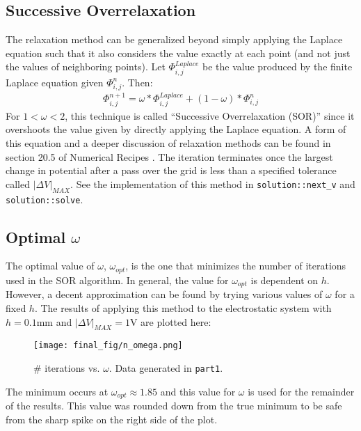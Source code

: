 \documentclass[12pt]{article}
\begin{document}
\subsection{Successive Overrelaxation}
The relaxation method can be generalized beyond simply applying the Laplace equation such that it also considers the value exactly at each point (and not just the values of neighboring points). Let $\Phi_{i, j}^{Laplace}$ be the value produced by the finite Laplace equation given $\Phi_{i, j}^n$. Then:
\begin{align*}
\Phi_{i, j}^{n+1} = \omega * \Phi_{i, j}^{Laplace} + (1 - \omega) * \Phi_{i, j}^{n}
\end{align*}
For $1 < \omega < 2$, this technique is called ``Successive Overrelaxation (SOR)'' since it overshoots the value given by directly applying the Laplace equation. A form of this equation and a deeper discussion of relaxation methods can be found in section 20.5 of Numerical Recipes \cite{numericalrecipes}. The iteration terminates once the largest change in potential after a pass over the grid is less than a specified tolerance called $|\Delta V|_{MAX}$. See the implementation of this method in \texttt{solution::next\_v} and \texttt{solution::solve}.
\subsection{Optimal $\omega$}
The optimal value of $\omega$, $\omega_{opt}$, is the one that minimizes the number of iterations used in the SOR algorithm. In general, the value for $\omega_{opt}$ is dependent on $h$. However, a decent approximation can be found by trying various values of $\omega$ for a fixed $h$. The results of applying this method to the electrostatic system with $h = 0.1$mm and $|\Delta V|_{MAX} = 1$V are plotted here:
\begin{figure}[H]
  \centering
  \texttt{[image: final\_fig/n\_omega.png]}
  \caption{\# iterations vs. $\omega$. Data generated in \texttt{part1}.}
\end{figure}
The minimum occurs at $\omega_{opt} \approx 1.85$ and this value for $\omega$ is used for the remainder of the results. This value was rounded down from the true minimum to be safe from the sharp spike on the right side of the plot.
\end{document}
